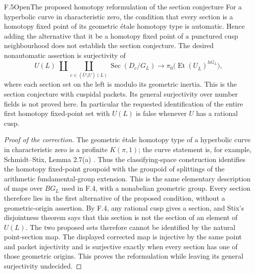 \begin{statement}{F.5}{Open}{The proposed homotopy reformulation of the section conjecture}
For a hyperbolic curve in characteristic zero, the condition that every
section is a homotopy fixed point of its geometric \'etale homotopy
type is automatic. Hence adding the alternative that it be a homotopy
fixed point of a punctured cusp neighbourhood does not establish the
section conjecture. The desired nonautomatic assertion is surjectivity
of
\[
 U(L)\;\amalg\!\coprod_{c\in(\overline U\setminus U)(L)}
       \operatorname{Sec}(D_c/G_L)
       \longrightarrow
       \pi_0\bigl(\operatorname{Et}(U_{\overline L})^{hG_L}\bigr),
\]
where each section set on the left is modulo its geometric inertia.
This is the section conjecture with cuspidal packets. Its general
surjectivity over number fields is not proved here. In particular the
requested identification of the entire first homotopy fixed-point set
with $U(L)$ is false whenever $U$ has a rational cusp.
\end{statement}
\begin{proof}[Proof of the correction]
The geometric \'etale homotopy type of a hyperbolic curve in
characteristic zero is a profinite $K(\pi,1)$; the curve statement is, for example,
Schmidt--Stix, Lemma 2.7(a) \cite{fghSchmidtStix}. Thus the classifying-space
construction identifies the homotopy fixed-point groupoid with the
groupoid of splittings of the arithmetic fundamental-group extension.
This is the same elementary description of maps over $BG_L$ used in
F.4, with a nonabelian geometric group. Every section therefore lies
in the first alternative of the proposed condition, without a
geometric-origin assertion. By F.4, any rational cusp gives a section,
and Stix's disjointness theorem says that this section is not the
section of an element of $U(L)$. The two proposed sets therefore cannot
be identified by the natural point-section map. The displayed corrected
map is injective by the same point and packet injectivity and is
surjective exactly when every section has one of those geometric
origins. This proves the reformulation while leaving its general
surjectivity undecided.
\end{proof}

